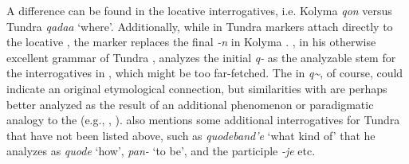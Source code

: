 A difference can be found in the locative interrogatives, i.e. Kolyma \textit{qon} versus Tundra \textit{qadaa} ‘where’. Additionally, while in Tundra   markers attach directly to the locative , the  marker replaces the final \textit{-n} in Kolyma . \cite[186, 208]{Schmalz2013}, in his otherwise excellent grammar of Tundra , analyzes the initial \textit{q-} as the analyzable  stem for the interrogatives in , which might be too far-fetched. The  in \textit{q\textasciitilde}, of course, could indicate an original etymological connection, but similarities with  are perhaps better analyzed as the result of an additional  phenomenon or paradigmatic analogy to the  (e.g., \citealt{Diessel2003}, \citealt{BickelNichols2007}). \cite[186, 208]{Schmalz2013} also mentions some additional interrogatives for Tundra  that have not been listed above, such as \textit{quodeband'e} ‘what kind of’ that he analyzes as \textit{quode} ‘how’, \textit{pan-} ‘to be’, and the participle \textit{-je} etc.
